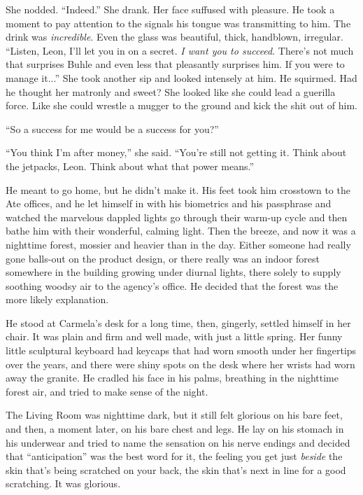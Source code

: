 She nodded. “Indeed.” She drank. Her face suffused with pleasure. 
He took a moment to pay attention to the signals his tongue was 
transmitting to him. The drink was \emph{incredible}. Even the glass 
was beautiful, thick, handblown, irregular. “Listen, Leon, I'll let 
you in on a secret. \emph{I want you to succeed}. There's not much that 
surprises Buhle and even less that pleasantly surprises him. If you 
were to manage it...” She took another sip and looked intensely at 
him. He squirmed. Had he thought her matronly and sweet? She looked 
like she could lead a guerilla force. Like she could wrestle a mugger 
to the ground and kick the shit out of him.

“So a success for me would be a success for you?”

“You think I'm after money,” she said. “You're still not getting 
it. Think about the jetpacks, Leon. Think about what that power 
means.”

\tb

He meant to go home, but he didn't make it. His feet took him crosstown 
to the Ate offices, and he let himself in with his biometrics and his 
passphrase and watched the marvelous dappled lights go through their 
warm-up cycle and then bathe him with their wonderful, calming light. 
Then the breeze, and now it was a nighttime forest, mossier and heavier 
than in the day. Either someone had really gone balls-out on the 
product design, or there really was an indoor forest somewhere in the 
building growing under diurnal lights, there solely to supply soothing 
woodsy air to the agency's office. He decided that the forest was the 
more likely explanation.

He stood at Carmela's desk for a long time, then, gingerly, settled 
himself in her chair. It was plain and firm and well made, with just a 
little spring. Her funny little sculptural keyboard had keycaps that 
had worn smooth under her fingertips over the years, and there were 
shiny spots on the desk where her wrists had worn away the granite. He 
cradled his face in his palms, breathing in the nighttime forest air, 
and tried to make sense of the night.

The Living Room was nighttime dark, but it still felt glorious on his 
bare feet, and then, a moment later, on his bare chest and legs. He lay 
on his stomach in his underwear and tried to name the sensation on his 
nerve endings and decided that “anticipation” was the best word for 
it, the feeling you get just \emph{beside} the skin that's being 
scratched on your back, the skin that's next in line for a good 
scratching. It was glorious.

